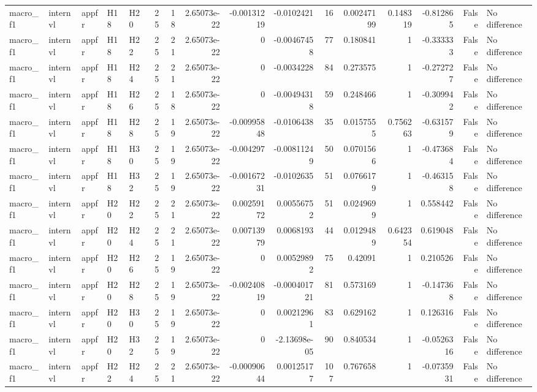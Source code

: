 \begin{longtable}{lllllrrrrrrrrrrl}
macro\_f1 & internvl & appfr & H18 & H20 & 25 & 18 & 2.65073e-22 & -0.00131219 & -0.0102421 & 16 & 0.00247199 & 0.148319 & -0.812865 & False & No difference \\
macro\_f1 & internvl & appfr & H18 & H22 & 25 & 21 & 2.65073e-22 & 0 & -0.00467458 & 77 & 0.180841 & 1 & -0.333333 & False & No difference \\
macro\_f1 & internvl & appfr & H18 & H24 & 25 & 21 & 2.65073e-22 & 0 & -0.0034228 & 84 & 0.273575 & 1 & -0.272727 & False & No difference \\
macro\_f1 & internvl & appfr & H18 & H26 & 25 & 18 & 2.65073e-22 & 0 & -0.00494318 & 59 & 0.248466 & 1 & -0.309942 & False & No difference \\
macro\_f1 & internvl & appfr & H18 & H28 & 25 & 19 & 2.65073e-22 & -0.00995848 & -0.0106438 & 35 & 0.0157555 & 0.756263 & -0.631579 & False & No difference \\
macro\_f1 & internvl & appfr & H18 & H30 & 25 & 19 & 2.65073e-22 & -0.004297 & -0.00811249 & 50 & 0.0701566 & 1 & -0.473684 & False & No difference \\
macro\_f1 & internvl & appfr & H18 & H32 & 25 & 19 & 2.65073e-22 & -0.00167231 & -0.0102635 & 51 & 0.0766179 & 1 & -0.463158 & False & No difference \\
macro\_f1 & internvl & appfr & H20 & H22 & 25 & 21 & 2.65073e-22 & 0.00259172 & 0.00556752 & 51 & 0.0249699 & 1 & 0.558442 & False & No difference \\
macro\_f1 & internvl & appfr & H20 & H24 & 25 & 21 & 2.65073e-22 & 0.00713979 & 0.0068193 & 44 & 0.0129489 & 0.642354 & 0.619048 & False & No difference \\
macro\_f1 & internvl & appfr & H20 & H26 & 25 & 19 & 2.65073e-22 & 0 & 0.00529892 & 75 & 0.42091 & 1 & 0.210526 & False & No difference \\
macro\_f1 & internvl & appfr & H20 & H28 & 25 & 19 & 2.65073e-22 & -0.00240819 & -0.000401721 & 81 & 0.573169 & 1 & -0.147368 & False & No difference \\
macro\_f1 & internvl & appfr & H20 & H30 & 25 & 19 & 2.65073e-22 & 0 & 0.00212961 & 83 & 0.629162 & 1 & 0.126316 & False & No difference \\
macro\_f1 & internvl & appfr & H20 & H32 & 25 & 19 & 2.65073e-22 & 0 & -2.13698e-05 & 90 & 0.840534 & 1 & -0.0526316 & False & No difference \\
macro\_f1 & internvl & appfr & H22 & H24 & 25 & 21 & 2.65073e-22 & -0.00090644 & 0.00125177 & 107 & 0.767658 & 1 & -0.0735931 & False & No difference \\

\end{longtable}
